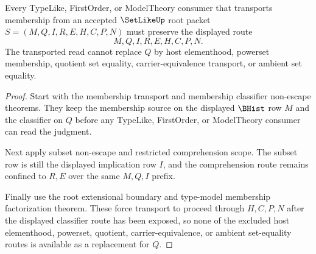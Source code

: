 \begin{theorem}
\label{thm:setlike-membership-classifier-transport-boundary}
Every TypeLike, FirstOrder, or ModelTheory consumer that transports membership from an accepted $\SetLikeUp$ root packet $S=(M,Q,I,R,E,H,C,P,N)$ must preserve the displayed route
$$
M,Q,I,R,E,H,C,P,N .
$$
The transported read cannot replace $Q$ by host elementhood, powerset membership, quotient set equality, carrier-equivalence transport, or ambient set equality.
\end{theorem}
\begin{proof}
Start with the membership transport and membership classifier non-escape theorems. They keep the membership source on the displayed $\BHist$ row $M$ and the classifier on $Q$ before any TypeLike, FirstOrder, or ModelTheory consumer can read the judgment.

Next apply subset non-escape and restricted comprehension scope. The subset row is still the displayed implication row $I$, and the comprehension route remains confined to $R,E$ over the same $M,Q,I$ prefix.

Finally use the root extensional boundary and type-model membership factorization theorem. These force transport to proceed through $H,C,P,N$ after the displayed classifier route has been exposed, so none of the excluded host elementhood, powerset, quotient, carrier-equivalence, or ambient set-equality routes is available as a replacement for $Q$.
\end{proof}
